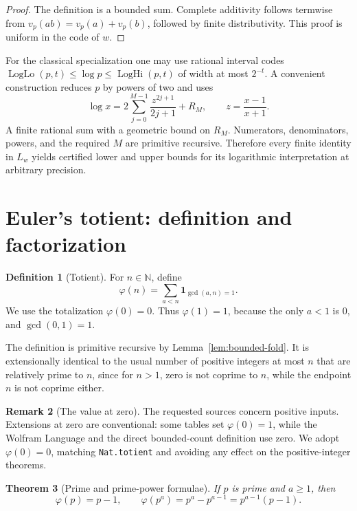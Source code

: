 \documentclass[11pt]{article}
\newtheorem{theorem}{Theorem}[section]
\theoremstyle{definition}
\newtheorem{definition}[theorem]{Definition}
\newtheorem{remark}[theorem]{Remark}
\newcommand{\N}{\mathbb N}
\newcommand{\code}[1]{\nolinkurl{#1}}
\newcommand{\ind}[1]{\mathbf 1_{#1}}
\begin{document}
\begin{proof}
The definition is a bounded sum.  Complete additivity follows termwise from
\(v_p(ab)=v_p(a)+v_p(b)\), followed by finite distributivity.  This proof is
uniform in the code of \(w\).
\end{proof}

For the classical specialization one may use rational interval codes
\(\operatorname{LogLo}(p,t)\le\log p\le\operatorname{LogHi}(p,t)\) of width
at most \(2^{-t}\).  A convenient construction reduces \(p\) by powers of two
and uses
\[
 \log x=2\sum_{j=0}^{M-1}\frac{z^{2j+1}}{2j+1}+R_M,
 \qquad z=\frac{x-1}{x+1}.
\]
A finite rational sum with a geometric bound on \(R_M\).  Numerators,
denominators, powers, and the required \(M\) are primitive recursive.
Therefore every finite identity in \(L_w\) yields certified lower and upper
bounds for its logarithmic interpretation at arbitrary precision.

\section{Euler's totient: definition and factorization}

\begin{definition}[Totient]\label{def:totient}
For \(n\in\N\), define
\[
 \varphi(n)=\sum_{a<n}\ind{\gcd(a,n)=1}.
\]
We use the totalization \(\varphi(0)=0\).  Thus \(\varphi(1)=1\), because the
only \(a<1\) is \(0\), and \(\gcd(0,1)=1\).
\end{definition}

The definition is primitive recursive by Lemma~\ref{lem:bounded-fold}.  It is
extensionally identical to the usual number of positive integers at most
\(n\) that are relatively prime to \(n\), since for \(n>1\), zero is not
coprime to \(n\), while the endpoint \(n\) is not coprime either.

\begin{remark}[The value at zero]
The requested sources concern positive inputs.  Extensions at zero are conventional: some tables set \(\varphi(0)=1\), while the Wolfram Language and the direct bounded-count definition use zero.  We adopt \(\varphi(0)=0\), matching \code{Nat.totient} and avoiding any effect on the positive-integer theorems.
\end{remark}

\begin{theorem}[Prime and prime-power formulae]\label{thm:phi-prime-power}
If \(p\) is prime and \(a\ge1\), then
\[
 \varphi(p)=p-1,
 \qquad
 \varphi(p^a)=p^a-p^{a-1}=p^{a-1}(p-1).
\]
\end{theorem}
\end{document}
